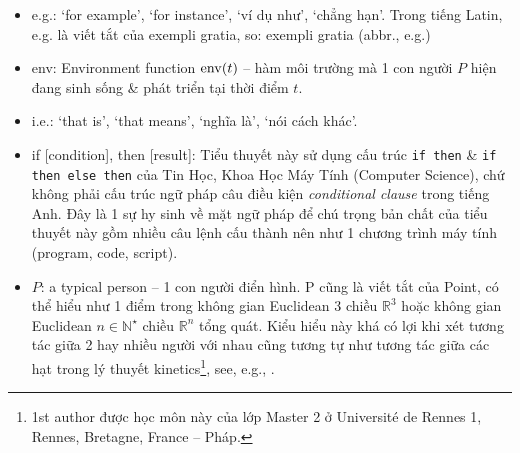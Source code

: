 \documentclass[12pt,twoside]{book}
\begin{document}
\begin{itemize}
	Hàm ĐM này cũng có thể tác động lên các biến số khác không phải biến người, e.g., ĐM nghề nghiệp (Fuck my career), ĐM cuộc đời (Fuck my life or Fuck this whole Life). Nên nghĩ thoáng trong việc sử dụng hàm này, thậm chí có thể xem nó là 1 toán tử, i.e., hàm của hàm, e.g., $P_1$ chửi ĐM lên cái hành động $P_2$ chửi ĐM $P_3$ với lý do có thể là $P_1$ \& $P_3$ là 2 cô bạn thân hoặc chị em kết nghĩa nhưng $P_3$ giật bồ{\tt/}chồng dê già của bà thím $P_2$ siêu hung dữ nên bị $P_2$ chửi sấp mặt lợn (abbr., sml) \& bị đánh ghen như trong cảnh đầu phim {\it Cánh Đồng Bất Tận}, xong $P_1$ với vai trò là bạn chí cốt của $P_3$, thấy bạn bè bị trét ớt vô vùng kín rồi chế keo dán sắt 502 để dán 2 mép lại (đến mức Dạ Hương cũng chịu thua, không đỡ nổi) mà \st{lồn} âm vật đau như cắt, nước mắt đầm đìa, bèn đứng ra chửi $P_2$ phụ $P_1$ bạn mình. Các mối quan hệ trong cuộc sống thường rối rắm, lung tung ben như thế. Bài học ở đây là phải sử dụng hàm hoặc toán tử ĐM 1 cách hợp lý (reasonably), chính xác (accurately, precisely), \& cực kỳ logic (logically) trong bất kỳ trường hợp nào trong cuộc sống thì mới có khả năng thấu hiểu Đạo trong cuộc sống được.
	\item e.g.: `for example', `for instance', `ví dụ như', `chẳng hạn'. Trong tiếng Latin, e.g. là viết tắt của exempli gratia, so: exempli gratia (abbr., e.g.)
	\item env: Environment function ${\rm env}(t)$ -- hàm môi trường mà 1 con người $P$ hiện đang sinh sống \& phát triển tại thời điểm $t$.
	\item i.e.: `that is', `that means', `nghĩa là', `nói cách khác'.
	\item if [{\sf condition}], then [{\sf result}]: Tiểu thuyết này sử dụng cấu trúc {\tt if then} \& {\tt if then else then} của Tin Học, Khoa Học Máy Tính (Computer Science), chứ không phải cấu trúc ngữ pháp câu điều kiện {\it conditional clause} trong tiếng Anh. Đây là 1 sự hy sinh về mặt ngữ pháp để chú trọng bản chất của tiểu thuyết này gồm nhiều câu lệnh cấu thành nên như 1 chương trình máy tính (program, code, script).
	\item $P$: a typical person -- 1 con người điển hình. P cũng là viết tắt của Point, có thể hiểu như 1 điểm trong không gian Euclidean 3 chiều $\mathbb{R}^3$ hoặc không gian Euclidean $n\in\mathbb{N}^\star$ chiều $\mathbb{R}^n$ tổng quát. Kiểu hiểu này khá có lợi khi xét tương tác giữa 2 hay nhiều người với nhau cũng tương tự như tương tác giữa các hạt trong lý thuyết kinetics\footnote{1st author được học môn này của lớp Master 2 ở Universit\'e de Rennes 1, Rennes, Bretagne, France -- Pháp.}, see, e.g., \cite{Tartar2008}.
	

\end{itemize}
\end{document}
